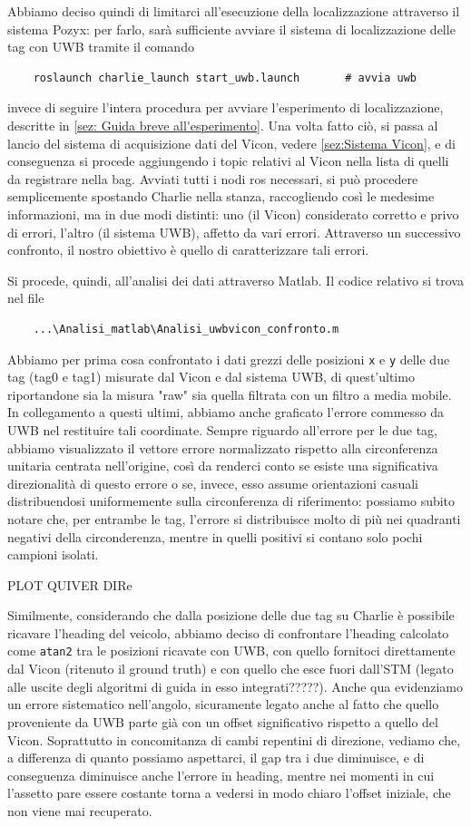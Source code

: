 Abbiamo deciso quindi di limitarci all'esecuzione della localizzazione attraverso il sistema Pozyx: per farlo, sarà sufficiente avviare il sistema di localizzazione delle tag con UWB tramite il comando 
\begin{verbatim}
	roslaunch charlie_launch start_uwb.launch		# avvia uwb
\end{verbatim} 
invece di seguire l'intera procedura per avviare l'esperimento di localizzazione, descritte in \ref{sez: Guida breve all'esperimento}.
Una volta fatto ciò, si passa al lancio del sistema di acquisizione dati del Vicon, vedere \ref{sez:Sistema Vicon}, e di conseguenza si procede aggiungendo i topic relativi al Vicon nella lista di quelli da registrare nella bag. 
Avviati tutti i nodi ros necessari, si può procedere semplicemente spostando Charlie nella stanza, raccogliendo così le medesime informazioni, ma in due modi distinti: uno (il Vicon) considerato corretto e privo di errori, l'altro (il sistema UWB), affetto da vari errori. Attraverso un successivo confronto, il nostro obiettivo è quello di caratterizzare tali errori.

Si procede, quindi, all'analisi dei dati attraverso Matlab. Il codice relativo si trova nel file
\begin{verbatim}
	...\Analisi_matlab\Analisi_uwbvicon_confronto.m
\end{verbatim}  
Abbiamo per prima cosa confrontato i dati grezzi delle posizioni \verb|x| e \verb|y| delle due tag (tag0 e tag1) misurate dal Vicon e dal sistema UWB, di quest'ultimo riportandone sia la misura "raw" sia quella filtrata con un filtro a media mobile. In collegamento a questi ultimi, abbiamo anche graficato l'errore commesso da UWB nel restituire tali coordinate.
Sempre riguardo all'errore per le due tag, abbiamo visualizzato il vettore errore normalizzato rispetto alla circonferenza unitaria centrata nell'origine, così da renderci conto se esiste una significativa direzionalità di questo errore o se, invece, esso assume orientazioni casuali distribuendosi uniformemente sulla circonferenza di riferimento: possiamo subito notare che, per entrambe le tag, l'errore si distribuisce molto di più nei quadranti negativi della circonderenza, mentre in quelli positivi si contano solo pochi campioni isolati.

PLOT QUIVER DIRe

Similmente, considerando che dalla posizione delle due tag su Charlie è possibile ricavare l'heading del veicolo, abbiamo deciso di confrontare l'heading calcolato come \verb|atan2| tra le posizioni ricavate con UWB, con quello fornitoci direttamente dal Vicon (ritenuto il ground truth) e con quello che esce fuori dall'STM (legato alle uscite degli algoritmi di guida in esso integrati?????). Anche qua evidenziamo un errore sistematico nell'angolo, sicuramente legato anche al fatto che quello proveniente da UWB parte già con un offset significativo rispetto a quello del Vicon. Soprattutto in concomitanza di cambi repentini di direzione, vediamo che, a differenza di quanto possiamo aspettarci, il gap tra i due diminuisce, e di conseguenza diminuisce anche l'errore in heading, mentre nei momenti in cui l'assetto pare essere costante torna a vedersi in modo chiaro l'offset iniziale, che non viene mai recuperato.

